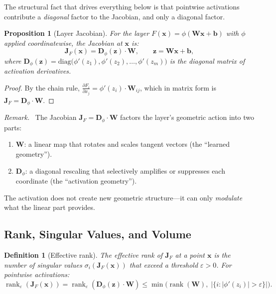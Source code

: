 \documentclass[11pt,a4paper]{article}
\newtheorem{proposition}[theorem]{Proposition}
\newtheorem{definition}[theorem]{Definition}
\theoremstyle{remark}
\newenvironment{geometricinsight}{\par\medskip\noindent\textit{Remark.}\ }{\par\medskip}
\begin{document}
The structural fact that drives everything below is that pointwise activations contribute a \emph{diagonal} factor to the Jacobian, and only a diagonal factor.

\begin{proposition}[Layer Jacobian]
\label{prop:jacobian}
For the layer $F(\mathbf{x}) = \phi(\mathbf{W}\mathbf{x} + \mathbf{b})$ with $\phi$ applied coordinatewise, the Jacobian at $\mathbf{x}$ is:
\begin{equation}
  \mathbf{J}_F(\mathbf{x}) = \mathbf{D}_\phi(\mathbf{z}) \cdot \mathbf{W}, \qquad \mathbf{z} = \mathbf{W}\mathbf{x} + \mathbf{b},
  \label{eq:jacobian}
\end{equation}
where $\mathbf{D}_\phi(\mathbf{z}) = \mathrm{diag}\bigl(\phi'(z_1), \phi'(z_2), \dots, \phi'(z_m)\bigr)$ is the diagonal matrix of activation derivatives.
\end{proposition}

\begin{proof}
By the chain rule, $\frac{\partial F_i}{\partial x_j} = \phi'(z_i) \cdot \mathbf{W}_{ij}$, which in matrix form is $\mathbf{J}_F = \mathbf{D}_\phi \cdot \mathbf{W}$.
\end{proof}

\begin{geometricinsight}
The Jacobian $\mathbf{J}_F = \mathbf{D}_\phi \cdot \mathbf{W}$ factors the layer's geometric action into two parts:
\begin{enumerate}[label=(\alph*)]
  \item $\mathbf{W}$: a linear map that rotates and scales tangent vectors (the ``learned geometry'').
  \item $\mathbf{D}_\phi$: a diagonal rescaling that selectively amplifies or suppresses each coordinate (the ``activation geometry'').
\end{enumerate}
The activation does not create new geometric structure---it can only \emph{modulate} what the linear part provides.
\end{geometricinsight}

\subsection{Rank, Singular Values, and Volume}

\begin{definition}[Effective rank]
\label{def:effective-rank}
The \emph{effective rank} of $\mathbf{J}_F$ at a point $\mathbf{x}$ is the number of singular values $\sigma_i(\mathbf{J}_F(\mathbf{x}))$ that exceed a threshold $\varepsilon > 0$.
For pointwise activations:
\begin{equation}
  \operatorname{rank}_\varepsilon(\mathbf{J}_F(\mathbf{x})) = \operatorname{rank}_\varepsilon(\mathbf{D}_\phi(\mathbf{z}) \cdot \mathbf{W}) \leq \min\bigl(\operatorname{rank}(\mathbf{W}),\; |\{i : |\phi'(z_i)| > \varepsilon\}|\bigr).
  \label{eq:effective-rank}
\end{equation}
\end{definition}
\end{document}
